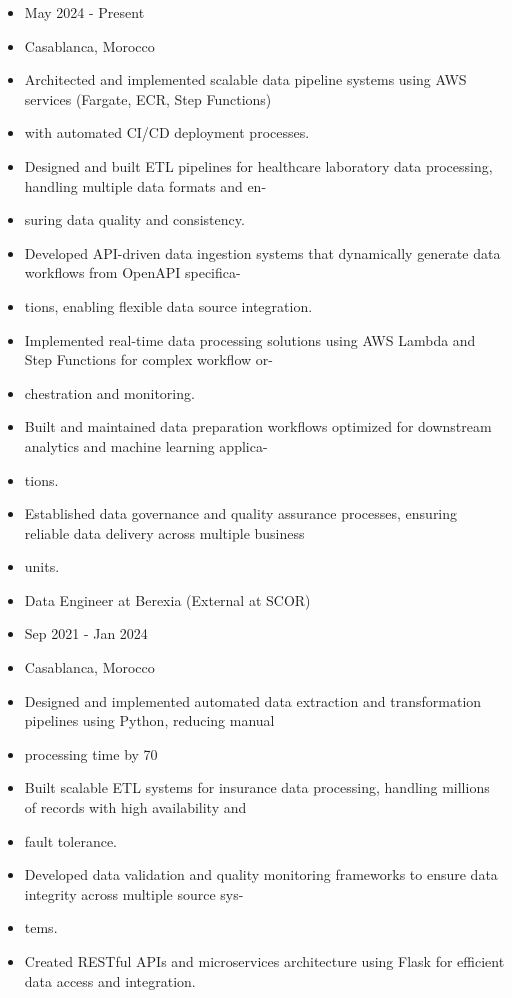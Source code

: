 \documentclass[10pt,a4paper,ragged2e,withhyper]{altacv}
\begin{document}
\begin{itemize}[noitemsep]
\item May 2024 - Present
\item Casablanca, Morocco
\item Architected and implemented scalable data pipeline systems using AWS services (Fargate, ECR, Step Functions)
\item with automated CI/CD deployment processes.
\item Designed and built ETL pipelines for healthcare laboratory data processing, handling multiple data formats and en-
\item suring data quality and consistency.
\item Developed API-driven data ingestion systems that dynamically generate data workflows from OpenAPI specifica-
\item tions, enabling flexible data source integration.
\item Implemented real-time data processing solutions using AWS Lambda and Step Functions for complex workflow or-
\item chestration and monitoring.
\item Built and maintained data preparation workflows optimized for downstream analytics and machine learning applica-
\item tions.
\item Established data governance and quality assurance processes, ensuring reliable data delivery across multiple business
\item units.
\item Data Engineer at Berexia (External at SCOR)
\item Sep 2021 - Jan 2024
\item Casablanca, Morocco
\item Designed and implemented automated data extraction and transformation pipelines using Python, reducing manual
\item processing time by 70%
\item Built scalable ETL systems for insurance data processing, handling millions of records with high availability and
\item fault tolerance.
\item Developed data validation and quality monitoring frameworks to ensure data integrity across multiple source sys-
\item tems.
\item Created RESTful APIs and microservices architecture using Flask for efficient data access and integration.

\end{itemize}
\end{document}
